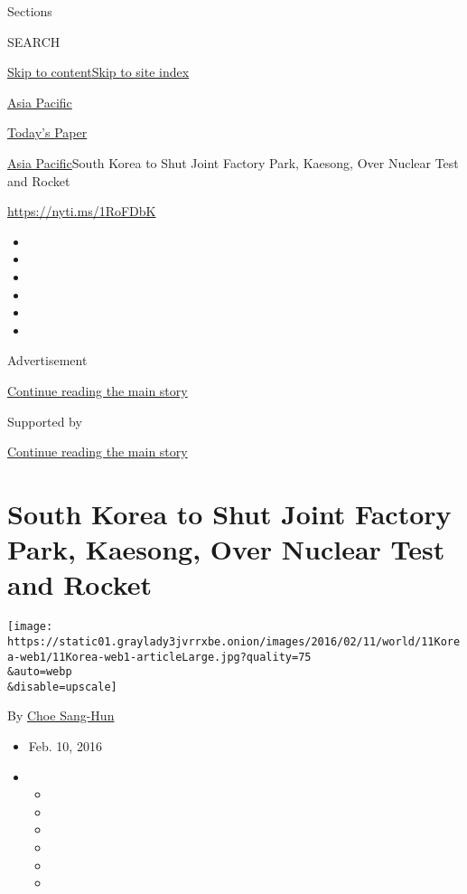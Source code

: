 Sections

SEARCH

\protect\hyperlink{site-content}{Skip to
content}\protect\hyperlink{site-index}{Skip to site index}

\href{https://www.nytimes3xbfgragh.onion/section/world/asia}{Asia
Pacific}

\href{https://myaccount.nytimes3xbfgragh.onion/auth/login?response_type=cookie\&client_id=vi}{}

\href{https://www.nytimes3xbfgragh.onion/section/todayspaper}{Today's
Paper}

\href{/section/world/asia}{Asia Pacific}\textbar{}South Korea to Shut
Joint Factory Park, Kaesong, Over Nuclear Test and Rocket

\url{https://nyti.ms/1RoFDbK}

\begin{itemize}
\item
\item
\item
\item
\item
\item
\end{itemize}

Advertisement

\protect\hyperlink{after-top}{Continue reading the main story}

Supported by

\protect\hyperlink{after-sponsor}{Continue reading the main story}

\hypertarget{south-korea-to-shut-joint-factory-park-kaesong-over-nuclear-test-and-rocket}{%
\section{South Korea to Shut Joint Factory Park, Kaesong, Over Nuclear
Test and
Rocket}\label{south-korea-to-shut-joint-factory-park-kaesong-over-nuclear-test-and-rocket}}

\texttt{[image: https://static01.graylady3jvrrxbe.onion/images/2016/02/11/world/11Korea-web1/11Korea-web1-articleLarge.jpg?quality=75\\\&auto=webp\\\&disable=upscale]}

By \href{http://www.nytimes3xbfgragh.onion/by/choe-sang-hun}{Choe
Sang-Hun}

\begin{itemize}
\item
  Feb. 10, 2016
\item
  \begin{itemize}
  \item
  \item
  \item
  \item
  \item
  \item
  \end{itemize}
\end{itemize}

